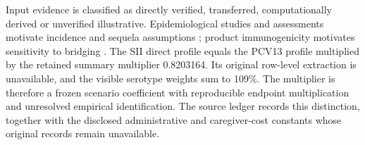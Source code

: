 \documentclass[10pt,letterpaper]{article}
\begin{document}
Input evidence is classified as directly verified, transferred, computationally derived or unverified illustrative. Epidemiological studies and assessments motivate incidence and sequela assumptions \cite{Wahl2018,Edmond2010,PhilippinesHTA}; product immunogenicity motivates sensitivity to bridging \cite{Adigweme2023}. The SII direct profile equals the PCV13 profile multiplied by the retained summary multiplier 0.8203164. Its original row-level extraction is unavailable, and the visible serotype weights sum to 109\%. The multiplier is therefore a frozen scenario coefficient with reproducible endpoint multiplication and unresolved empirical identification. The source ledger records this distinction, together with the disclosed administrative and caregiver-cost constants whose original records remain unavailable.

\begingroup\small\singlespacing\setlength{\tabcolsep}{3pt}
\end{document}
